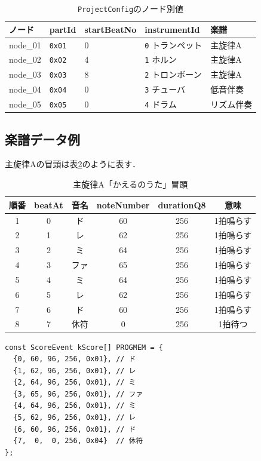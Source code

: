 \documentclass[lualatex,book,paper=a4paper,jafontsize=11.5pt,jafontscale=1.05]{jlreq}
\newcommand{\code}[1]{\texttt{#1}}
\begin{document}
\begin{table}[H]
\centering
\caption{\code{ProjectConfig}のノード別値}
\label{tab:saito-config-values}
\begin{tabular}{p{}p{}p{}p{}p{}}
\toprule
\textbf{ノード} & \textbf{partId} & \textbf{startBeatNo} & \textbf{instrumentId} & \textbf{楽譜} \\
\midrule
node\_01 & \code{0x01} & 0 & \code{0} トランペット & 主旋律A \\
node\_02 & \code{0x02} & 4 & \code{1} ホルン & 主旋律A \\
node\_03 & \code{0x03} & 8 & \code{2} トロンボーン & 主旋律A \\
node\_04 & \code{0x04} & 0 & \code{3} チューバ & 低音伴奏 \\
node\_05 & \code{0x05} & 0 & \code{4} ドラム & リズム伴奏 \\
\bottomrule
\end{tabular}
\end{table}

\subsection{楽譜データ例}

主旋律Aの冒頭は表\ref{tab:saito-melody}のように表す．

\begin{table}[H]
\centering
\caption{主旋律A「かえるのうた」冒頭}
\label{tab:saito-melody}
\begin{tabular}{cccccc}
\toprule
\textbf{順番} & \textbf{beatAt} & \textbf{音名} & \textbf{noteNumber} & \textbf{durationQ8} & \textbf{意味} \\
\midrule
1 & 0 & ド & 60 & 256 & 1拍鳴らす \\
2 & 1 & レ & 62 & 256 & 1拍鳴らす \\
3 & 2 & ミ & 64 & 256 & 1拍鳴らす \\
4 & 3 & ファ & 65 & 256 & 1拍鳴らす \\
5 & 4 & ミ & 64 & 256 & 1拍鳴らす \\
6 & 5 & レ & 62 & 256 & 1拍鳴らす \\
7 & 6 & ド & 60 & 256 & 1拍鳴らす \\
8 & 7 & 休符 & 0 & 256 & 1拍待つ \\
\bottomrule
\end{tabular}
\end{table}

\begin{verbatim}
const ScoreEvent kScore[] PROGMEM = {
  {0, 60, 96, 256, 0x01}, // ド
  {1, 62, 96, 256, 0x01}, // レ
  {2, 64, 96, 256, 0x01}, // ミ
  {3, 65, 96, 256, 0x01}, // ファ
  {4, 64, 96, 256, 0x01}, // ミ
  {5, 62, 96, 256, 0x01}, // レ
  {6, 60, 96, 256, 0x01}, // ド
  {7,  0,  0, 256, 0x04}  // 休符
};
\end{verbatim}
\end{document}
